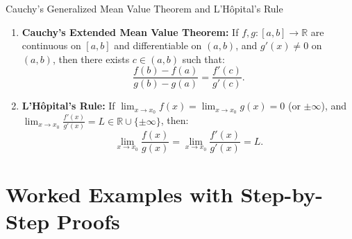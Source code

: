 \begin{theorembox}{Cauchy's Generalized Mean Value Theorem and L'Hôpital's Rule}
\begin{enumerate}[leftmargin=1.4em,itemsep=3pt]
  \item \textbf{Cauchy's Extended Mean Value Theorem:}
  If $f, g: [a, b] \longrightarrow \mathbb{R}$ are continuous on $[a, b]$ and differentiable on $(a, b)$, and $g'(x) \neq 0$ on $(a, b)$, then there exists $c \in (a, b)$ such that:
  \[
  \frac{f(b) - f(a)}{g(b) - g(a)} = \frac{f'(c)}{g'(c)}.
  \]
  \item \textbf{L'Hôpital's Rule:} If $\lim_{x \to x_0} f(x) = \lim_{x \to x_0} g(x) = 0$ (or $\pm\infty$), and $\lim_{x \to x_0} \frac{f'(x)}{g'(x)} = L \in \mathbb{R} \cup \{\pm\infty\}$, then:
  \[
  \lim_{x \to x_0} \frac{f(x)}{g(x)} = \lim_{x \to x_0} \frac{f'(x)}{g'(x)} = L.
  \]
\end{enumerate}
\end{theorembox}

\section{Worked Examples with Step-by-Step Proofs}

